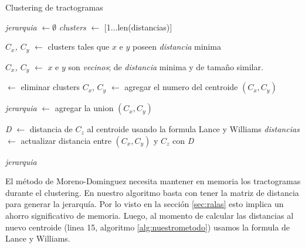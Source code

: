 \begin{algorithm}[h!]
\caption{Clustering de tractogramas}\label{alg:nuestrometodo}
\begin{algorithmic}[1]

                      
    \State \emph{jerarquia} $\gets \emptyset$
    \State \emph{clusters} $\gets$ [1$\dots$len(distancias)]                  
                      


        \State \emph{$C_x$, $C_y$} $\gets$ clusters tales que $x$ e $y$ poseen \emph{distancia} minima      
            
    \Else{}

        \State \emph{$C_x$, $C_y$} $\gets$ $x$ e $y$ son \emph{vecinos}; 
                                   de \emph{distancia} minima y de tama\~no similar.

    \EndIf
    
     $\gets$ eliminar clusters $C_x$, $C_y$
     $\gets$ agregar el numero del centroide $(C_x,C_y)$ 
                          
    \State \emph{jerarquia} $\gets$ agregar la union $(C_x,C_y)$
    
        \State \emph{D} $\gets$ distancia de $C_z$ al centroide usando la formula Lance y Williams
        \State \emph{distancias} $\gets$ actualizar distancia entre $(C_x,C_y)$ y $C_z$ con \emph{D}
    \EndFor            
    
\EndFor


\State \Return \emph{jerarquia} 
 
\EndProcedure 

\end{algorithmic}
\end{algorithm}

El m\'etodo de Moreno-Dominguez necesita mantener en memoria los tractogramas
durante el clustering. En nuestro algoritmo basta con tener la matriz de distancia
para generar la jerarqu\'ia. Por lo visto en la secci\'on \ref{sec:ralas} esto
implica un ahorro significativo de memoria. Luego, al momento de calcular las
distancias al nuevo centroide (linea 15, algoritmo \ref{alg:nuestrometodo}) usamos
la formula de Lance y Williams. \\

